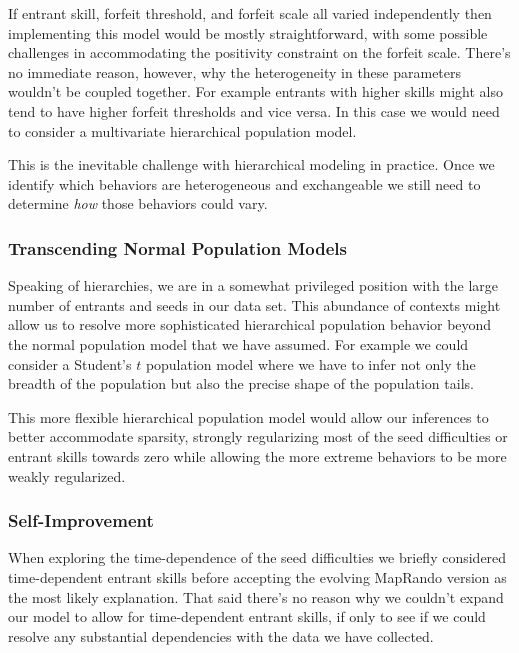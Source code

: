 \documentclass[
  letterpaper,
  DIV=11,
  numbers=noendperiod]{scrartcl}
\begin{document}
If entrant skill, forfeit threshold, and forfeit scale all varied
independently then implementing this model would be mostly
straightforward, with some possible challenges in accommodating the
positivity constraint on the forfeit scale. There's no immediate reason,
however, why the heterogeneity in these parameters wouldn't be coupled
together. For example entrants with higher skills might also tend to
have higher forfeit thresholds and vice versa. In this case we would
need to consider a multivariate hierarchical population model.

This is the inevitable challenge with hierarchical modeling in practice.
Once we identify which behaviors are heterogeneous and exchangeable we
still need to determine \emph{how} those behaviors could vary.

\subsubsection{Transcending Normal Population
Models}\label{transcending-normal-population-models}

Speaking of hierarchies, we are in a somewhat privileged position with
the large number of entrants and seeds in our data set. This abundance
of contexts might allow us to resolve more sophisticated hierarchical
population behavior beyond the normal population model that we have
assumed. For example we could consider a Student's \(t\) population
model where we have to infer not only the breadth of the population but
also the precise shape of the population tails.

This more flexible hierarchical population model would allow our
inferences to better accommodate sparsity, strongly regularizing most of
the seed difficulties or entrant skills towards zero while allowing the
more extreme behaviors to be more weakly regularized.

\subsubsection{Self-Improvement}\label{self-improvement}

When exploring the time-dependence of the seed difficulties we briefly
considered time-dependent entrant skills before accepting the evolving
MapRando version as the most likely explanation. That said there's no
reason why we couldn't expand our model to allow for time-dependent
entrant skills, if only to see if we could resolve any substantial
dependencies with the data we have collected.
\end{document}
